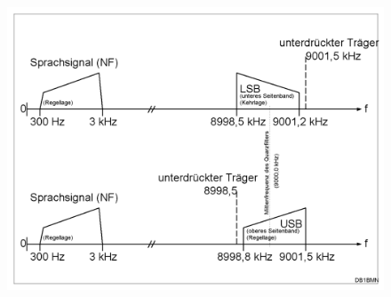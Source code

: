 \begin{frame}
  \begin{center}
    \begin{figure}
      \includegraphics[width=1\textwidth,height=1\textheight,keepaspectratio]{e14/Ssb-de.png}
    \end{figure}
  \end{center}
\end{frame}

